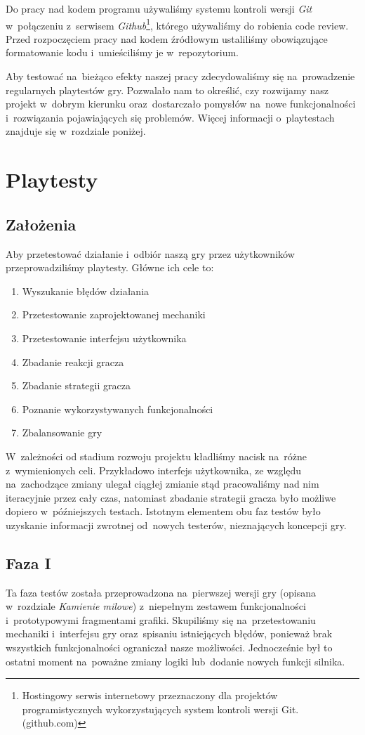 \documentclass[licencjacka]{pracamgr}
\begin{document}
    Do pracy nad kodem programu używaliśmy systemu kontroli wersji \emph{Git} w~połączeniu z~serwisem \emph{Github}\footnote{Hostingowy
    serwis internetowy przeznaczony dla projektów programistycznych wykorzystujących system kontroli wersji Git. (github.com)}, którego używaliśmy
    do robienia code review. Przed rozpoczęciem pracy nad kodem źródłowym ustaliliśmy obowiązujące formatowanie kodu i~umieściliśmy je w~repozytorium.

    Aby testować na~bieżąco efekty naszej pracy zdecydowaliśmy się na~prowadzenie regularnych playtestów gry. Pozwalało nam to określić,
    czy rozwijamy nasz projekt w~dobrym kierunku oraz~dostarczało pomysłów na~nowe funkcjonalności i~rozwiązania pojawiających się problemów.
    Więcej informacji o~playtestach znajduje się w~rozdziale poniżej.

\chapter{Playtesty}
  \section{Założenia}
    Aby przetestować działanie i~odbiór naszą gry przez użytkowników przeprowadziliśmy playtesty. Główne ich cele to:
    \begin{enumerate}
    \item Wyszukanie błędów działania
    \item Przetestowanie zaprojektowanej mechaniki
    \item Przetestowanie interfejsu użytkownika
    \item Zbadanie reakcji gracza
    \item Zbadanie strategii gracza
    \item Poznanie wykorzystywanych funkcjonalności
    \item Zbalansowanie gry
    \end{enumerate}
    W~zależności od stadium rozwoju projektu kładliśmy nacisk na~różne z~wymienionych celi. Przykładowo interfejs użytkownika,
    ze względu na~zachodzące zmiany ulegał ciągłej zmianie stąd pracowaliśmy nad nim iteracyjnie przez cały czas, natomiast
    zbadanie strategii gracza było możliwe dopiero w~późniejszych testach. Istotnym elementem obu faz testów było uzyskanie
    informacji zwrotnej od~nowych testerów, nieznających koncepcji gry.

  \section{Faza I}
    Ta faza testów została przeprowadzona na~pierwszej wersji gry (opisana w~rozdziale \emph{Kamienie milowe})
    z~niepełnym zestawem funkcjonalności i~prototypowymi fragmentami grafiki. Skupiliśmy się na~przetestowaniu mechaniki
    i~interfejsu gry oraz~spisaniu istniejących błędów, ponieważ brak wszystkich funkcjonalności ograniczał nasze możliwości.
    Jednocześnie był to ostatni moment na~poważne zmiany logiki lub~dodanie nowych funkcji silnika.
\end{document}
